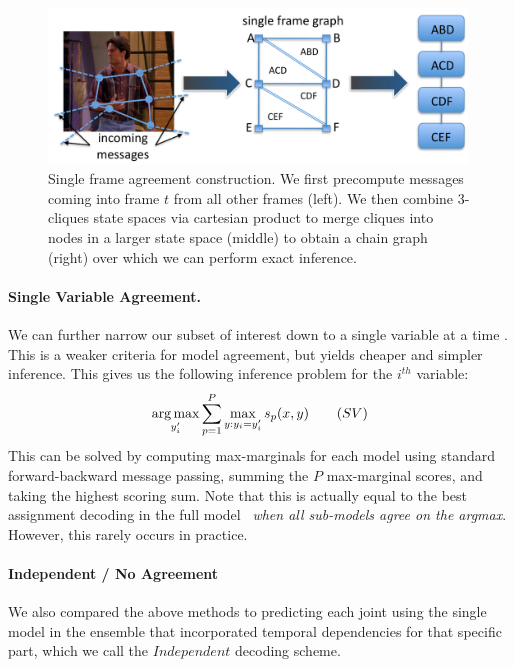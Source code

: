 \begin{figure}[tb]
\begin{center}
\includegraphics[width=0.99\textwidth]{figs/single-frame-agreement.pdf}
\caption[Single Frame Agreement construction]{Single frame agreement 
construction.  We first precompute messages coming into frame $t$ from all 
other frames (left).  We then combine 3-cliques state spaces via cartesian 
product to merge cliques into nodes in a larger state space (middle) to obtain 
a chain graph (right) over which we can perform exact inference.}
\label{fig:single-frame-agreement}
\end{center}
\end{figure}



\paragraph{Single Variable Agreement.} 

We can further narrow our subset of interest down to a single variable
at a time \cite{weisssapp10}.  This is a weaker criteria for model
agreement, but yields cheaper and simpler inference.  This gives us
the following inference problem for the $i^{th}$ variable:
\begin{equation}
\mathop{\arg\max}_{y_i'} \sum_{p=1}^P \max_{y: y_i=y_i'} s_p(x,y) \quad{}\quad{(SV)}
\end{equation}
This can be solved by computing max-marginals for each model using standard forward-backward message passing, summing the $P$ max-marginal scores, and taking the highest scoring sum.
Note that this is actually equal to the best assignment decoding in the full 
model~ {\em when all sub-models agree on the argmax}.  
However, this rarely occurs in practice.

\paragraph{Independent / No Agreement}
We also compared the above methods to predicting each joint using the single 
model in the ensemble that incorporated temporal dependencies for that
specific part, which we call the $Independent$ decoding scheme.


